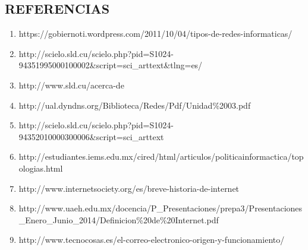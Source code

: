 \documentclass{bmcart}
\begin{document}
\begin{backmatter}


\section*{REFERENCIAS}
\begin{enumerate}
	\item https://gobiernoti.wordpress.com/2011/10/04/tipos-de-redes-informaticas/
	
	\item http://scielo.sld.cu/scielo.php?pid=S1024-94351995000100002\&script=sci\_arttext\&tlng=es/
	
	\item http://www.sld.cu/acerca-de
	
	\item http://ual.dyndns.org/Biblioteca/Redes/Pdf/Unidad\%2003.pdf 
	
	\item  http://scielo.sld.cu/scielo.php?pid=S1024-94352010000300006\&script=sci\_arttext 

	\item http://estudiantes.iems.edu.mx/cired/html/articulos/politicainformactica/topologias.html
	
	\item 
	http://www.internetsociety.org/es/breve-historia-de-internet
	 
	\item http://www.uaeh.edu.mx/docencia/P\_Presentaciones/prepa3/Presentaciones\_Enero\_Junio\_2014/Definicion\%20de\%20Internet.pdf
	
	\item http://www.tecnocosas.es/el-correo-electronico-origen-y-funcionamiento/
	

\end{enumerate}
\end{backmatter}
\end{document}
